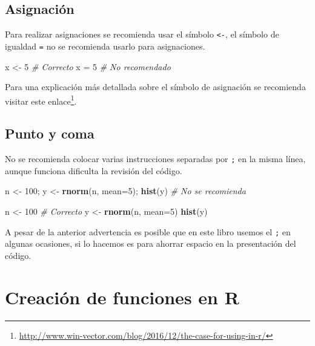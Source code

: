 \documentclass[10pt,]{krantz}
\makeatletter
\newenvironment{Shaded}{\begin{snugshade}}{\end{snugshade}}
\newcommand{\KeywordTok}[1]{\textcolor[rgb]{0.13,0.29,0.53}{\textbf{#1}}}
\newcommand{\DataTypeTok}[1]{\textcolor[rgb]{0.13,0.29,0.53}{#1}}
\newcommand{\DecValTok}[1]{\textcolor[rgb]{0.00,0.00,0.81}{#1}}
\newcommand{\StringTok}[1]{\textcolor[rgb]{0.31,0.60,0.02}{#1}}
\newcommand{\CommentTok}[1]{\textcolor[rgb]{0.56,0.35,0.01}{\textit{#1}}}
\newcommand{\NormalTok}[1]{#1}
\let\rmarkdownfootnote\footnote%
\def\footnote{\protect\rmarkdownfootnote}
\renewcommand{\href}[2]{#2\footnote{\url{#1}}}
\newenvironment{kframe}{%
\medskip{}
\setlength{\fboxsep}{.8em}
 \def\at@end@of@kframe{}%
 \ifinner\ifhmode%
  \def\at@end@of@kframe{\end{minipage}}%
  \begin{minipage}{\columnwidth}%
 \fi\fi%
 \def\FrameCommand##1{\hskip\@totalleftmargin \hskip-\fboxsep
 \colorbox{shadecolor}{##1}\hskip-\fboxsep
     \hskip-\linewidth \hskip-\@totalleftmargin \hskip\columnwidth}%
 \MakeFramed {\advance\hsize-\width
   \@totalleftmargin\z@ \linewidth\hsize
   \@setminipage}}%
 {\par\unskip\endMakeFramed%
 \at@end@of@kframe}
\renewenvironment{Shaded}{\begin{kframe}}{\end{kframe}}
\makeatother
\begin{document}
\subsection{Asignación}\label{asignacion}

Para realizar asignaciones se recomienda usar el símbolo
\texttt{\textless{}-}, el símbolo de igualdad \texttt{=} no se
recomienda usarlo para asignaciones.

\begin{Shaded}
\begin{Highlighting}[]
\NormalTok{x <-}\StringTok{ }\DecValTok{5}  \CommentTok{# Correcto}
\NormalTok{x =}\StringTok{ }\DecValTok{5}   \CommentTok{# No recomendado}
\end{Highlighting}
\end{Shaded}

Para una explicación más detallada sobre el símbolo de asignación se
recomienda visitar este
\href{http://www.win-vector.com/blog/2016/12/the-case-for-using-in-r/}{enlace}.

\subsection{Punto y coma}\label{punto-y-coma}

No se recomienda colocar varias instrucciones separadas por \texttt{;}
en la misma línea, aunque funciona dificulta la revisión del código.

\begin{Shaded}
\begin{Highlighting}[]
\NormalTok{n <-}\StringTok{ }\DecValTok{100}\NormalTok{; y <-}\StringTok{ }\KeywordTok{rnorm}\NormalTok{(n, }\DataTypeTok{mean=}\DecValTok{5}\NormalTok{); }\KeywordTok{hist}\NormalTok{(y)  }\CommentTok{# No se recomienda}

\NormalTok{n <-}\StringTok{ }\DecValTok{100}                                  \CommentTok{# Correcto}
\NormalTok{y <-}\StringTok{ }\KeywordTok{rnorm}\NormalTok{(n, }\DataTypeTok{mean=}\DecValTok{5}\NormalTok{)}
\KeywordTok{hist}\NormalTok{(y)}
\end{Highlighting}
\end{Shaded}

A pesar de la anterior advertencia es posible que en este libro usemos
el \texttt{;} en algunas ocasiones, si lo hacemos es para ahorrar
espacio en la presentación del código.

\section{Creación de funciones en R}\label{creafun}
\end{document}
